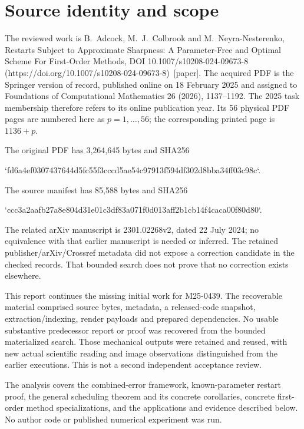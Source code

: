 \documentclass[10pt]{article}
\begin{document}
\section*{Source identity and scope}
The reviewed work is B. Adcock, M. J. Colbrook and M. Neyra-Nesterenko, Restarts Subject to Approximate Sharpness: A Parameter-Free and Optimal Scheme For First-Order Methods, DOI 10.1007/s10208-024-09673-8 (https://doi.org/10.1007/s10208-024-09673-8) [paper]. The acquired PDF is the Springer version of record, published online on 18 February 2025 and assigned to Foundations of Computational Mathematics 26 (2026), 1137–1192. The 2025 task membership therefore refers to its online publication year. Its 56 physical PDF pages are numbered here as \(p=1,\ldots,56\); the corresponding printed page is \(1136+p\).\par
The original PDF has 3,264,645 bytes and SHA256\par
`fd6a4ef0307437644d5fc55f3cccd5ae54c97913f594df302d8bba34ff03c98c`.\par
The source manifest has 85,588 bytes and SHA256\par
`ccc3a2aafb27a8e804d31e01c3df83a071f0d013aff2b1cb14f4caca00f80d80`.\par
The related arXiv manuscript is 2301.02268v2, dated 22 July 2024; no equivalence with that earlier manuscript is needed or inferred. The retained publisher/arXiv/Crossref metadata did not expose a correction candidate in the checked records. That bounded search does not prove that no correction exists elsewhere.\par
This report continues the missing initial work for M25-0439. The recoverable material comprised source bytes, metadata, a released-code snapshot, extraction/indexing, render payloads and prepared dependencies. No usable substantive predecessor report or proof was recovered from the bounded materialized search. Those mechanical outputs were retained and reused, with new actual scientific reading and image observations distinguished from the earlier executions. This is not a second independent acceptance review.\par
The analysis covers the combined-error framework, known-parameter restart proof, the general scheduling theorem and its concrete corollaries, concrete first-order method specializations, and the applications and evidence described below. No author code or published numerical experiment was run.\par
\end{document}
